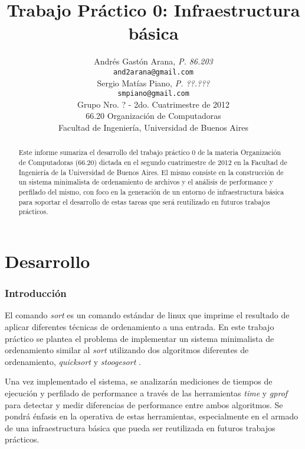 \documentclass[a4paper,11pt]{article}
\title{\textbf{Trabajo Práctico 0: Infraestructura básica}}
\author{
  Andrés Gastón Arana, \textit{P. 86.203}                          \\
  \texttt{and2arana@gmail.com}                                     \\
  Sergio Matías Piano, \textit{P. ??.???}                          \\
  \texttt{smpiano@gmail.com}                                       \\ [2.5ex]
  \normalsize{Grupo Nro. ? - 2do. Cuatrimestre de 2012}            \\
  \normalsize{66.20 Organización de Computadoras}                  \\
  \normalsize{Facultad de Ingeniería, Universidad de Buenos Aires}
}
\date{}
\begin{document}
\thispagestyle{empty}
\maketitle

\begin{abstract}
  Este informe sumariza el desarrollo del trabajo práctico 0 de la materia
  Organización de Computadoras (66.20) dictada en el segundo cuatrimestre de
  2012 en la Facultad de Ingeniería de la Universidad de Buenos Aires. El mismo
  consiste en la construcción de un sistema minimalista de ordenamiento de
  archivos y el análisis de performance y perfilado del mismo, con foco en la
  generación de un entorno de infraestructura básica para soportar el
  desarrollo de estas tareas que será reutilizado en futuros trabajos
  prácticos.
\end{abstract}

\clearpage

\tableofcontents
\clearpage


\part{Desarrollo}

\section{Introducción}

El comando \textit{sort} \cite{WIKISORT} es un comando estándar de linux que
imprime el resultado de aplicar diferentes técnicas de ordenamiento a una
entrada. En este trabajo práctico se plantea el problema de implementar un
sistema minimalista de ordenamiento similar al \textit{sort} utilizando dos
algoritmos diferentes de ordenamiento, \textit{quicksort} \cite{WIKIQS} y
\textit{stoogesort} \cite{WIKIST}.

Una vez implementado el sistema, se analizarán mediciones de tiempos de
ejecución y perfilado de performance a través de las herramientas \textit{time}
\cite{WIKITIME} y \textit{gprof} \cite{GPROF} para detectar y medir diferencias
de performance entre ambos algoritmos. Se pondrá énfasis en la operativa de
estas herramientas, especialmente en el armado de una infraestructura básica
que pueda ser reutilizada en futuros trabajos prácticos.
\end{document}

